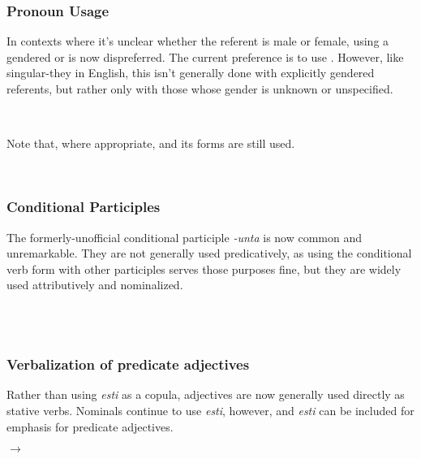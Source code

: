 
\subsubsection{Pronoun Usage}

In contexts where it's unclear whether the referent is male or female, using a gendered  or  is now dispreferred. The current preference is to use . However, like singular-they in English, this isn't generally done with explicitly gendered referents, but rather only with those whose gender is unknown or unspecified.

\ex
{}\\
\xe

Note that, where appropriate,  and its forms are still used.

\ex 
{}\\
\xe

\subsubsection{Conditional Participles}

The formerly-unofficial conditional participle \textit{-unta} is now common and unremarkable. They are not generally used predicatively, as using the conditional verb form with other participles serves those purposes fine, but they are widely used attributively and nominalized.

\pex
\a
{}\\
\a
{}\\
\xe

\subsubsection{Verbalization of predicate adjectives}

Rather than using \textit{esti} as a copula, adjectives are now generally used directly as stative verbs. Nominals continue to use \textit{esti}, however, and \textit{esti} can be included for emphasis for predicate adjectives.

\ex
{} $\to$ \\
\xe

